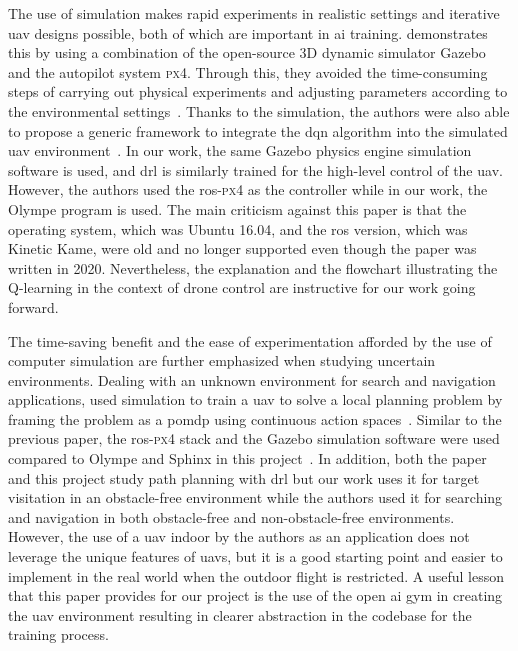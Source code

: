 \documentclass[../main.tex]{subfiles}
\begin{document}
	The use of simulation makes rapid experiments in realistic settings 
	and iterative \gls{uav} designs possible, 
	both of which are important in \gls{ai} training. 
	\citeauthor{Zho20} demonstrates this by %
	using a combination of the open-source 3D dynamic simulator Gazebo
	and the autopilot system \textsc{px4}.
	Through this, they avoided the time-consuming steps of 
	carrying out physical experiments
	and adjusting parameters according 
	to the environmental settings~\cite{Zho20}.
	Thanks to the simulation, 
	the authors were also able to propose a generic
	framework to integrate the \gls{dqn} algorithm into 
	the simulated \gls{uav} environment~\cite{Zho20}.
	In our work, the same Gazebo physics engine
	simulation software is used, and \gls{drl} is similarly trained
	for the high-level control of the \gls{uav}. 
	However, the authors used the \gls{ros}-\textsc{px4} as the controller 
	while in our work, the Olympe program is used.
	The main criticism against this paper is that the operating system,
	which was Ubuntu 16.04, and 
	the \gls{ros} version, which was Kinetic Kame, 
	were old and no longer supported 
	even though the paper was written in 2020.
	Nevertheless, the explanation and the flowchart illustrating the 
	Q-learning in the context of drone control are instructive 
	for our work going forward.
	
	The time-saving benefit and the ease of experimentation 
	afforded by the use of computer simulation are further emphasized 
	when studying uncertain environments.
	Dealing with an unknown environment for search and navigation applications,
	\citeauthor{Wal19} used simulation to train a \gls{uav}
	to solve a local planning problem
	by framing the problem as 
	a \gls{pomdp}
	using continuous action spaces~\cite{Wal19}.
	Similar to the previous paper, the \gls{ros}-\textsc{px4} stack 
	and the Gazebo 
	simulation software were used compared to Olympe and Sphinx 
	in this project~\cite{Wal19}.
	In addition, both the paper and this project study path planning 
	with \gls{drl} but our work uses it for target visitation 
	in an obstacle-free environment 
	while the authors used it for searching and navigation
	in both obstacle-free and non-obstacle-free environments.
	However, the use of a \gls{uav} indoor by the authors as an application 
	does not leverage the unique features of \glspl{uav}, 
	but it is a good starting point 
	and easier to implement in the real world 
	when the outdoor flight is restricted.
	A useful lesson that this paper provides for our project
	is the use of the open \gls{ai} gym in creating the \gls{uav} environment
	resulting in clearer abstraction in the codebase
	for the training process.
	
\end{document}
